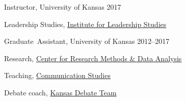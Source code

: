 \documentclass[11pt,letterpaper]{article}
\begin{document}
Instructor, University of Kansas \hfill 2017
\begin{outerlist}
\item[] Leadership Studies, \href{https://ils.ku.edu/about}{Institute
    for Leadership Studies}
\end{outerlist}
\vspace{.2in}
  
Graduate~Assistant, University of Kansas \hfill 2012--2017
\begin{outerlist}
\item[] Research, \href{http://www.crmda.ku.edu/}{Center for Research Methods \&
    Data Analysis}
\item[] Teaching, \href{http://www.coms.ku.edu/}{Communication Studies}
\item[] Debate coach, \href{http://www.debate.ku.edu/}{Kansas Debate Team}
\end{outerlist}
\end{document}
